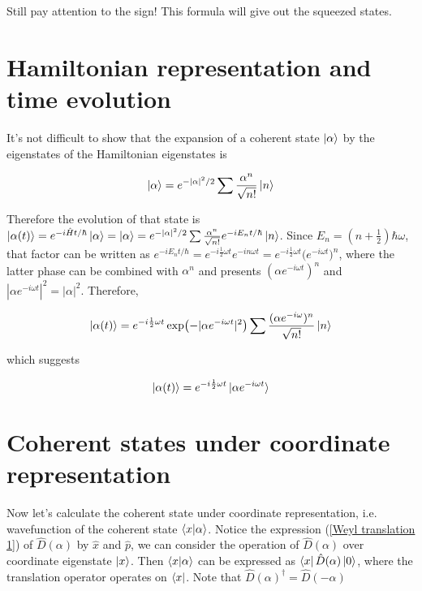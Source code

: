 \documentclass{article}
\begin{document}
        Still pay attention to the sign! This formula will give out the squeezed states. 

    


    \section{Hamiltonian representation and time evolution}
    
        It's not difficult to show that the expansion of a coherent state $\ket{\alpha}$ by the eigenstates of the Hamiltonian eigenstates is 

        \begin{equation}
            \ket{\alpha} = e^{-|\alpha|^2/2} \sum \frac{\alpha^n}{\sqrt{n!}}\ket{n}
        \end{equation}

        Therefore the evolution of that state is $\ket{\alpha(t)}=e^{-i\hat{H}t/\hbar}\ket{\alpha}=\ket{\alpha} = e^{-|\alpha|^2/2} \sum \frac{\alpha^n}{\sqrt{n!}}e^{-iE_nt/\hbar}\ket{n}$. Since $E_n=(n+\frac{1}{2})\hbar\omega$, that factor can be written as $e^{-iE_nt/\hbar}=e^{-i\frac{1}{2}\omega t}e^{-in\omega t}=e^{-i\frac{1}{2}\omega t}\bigl(e^{-i\omega t}\bigr)^n$, where the latter phase can be combined with $\alpha^n$ and presents $(\alpha e^{-i\omega t})^n$ and $|\alpha e^{-i\omega t}|^2=|\alpha|^2$. Therefore, 

        \begin{equation}
            \ket{\alpha(t)} = e^{-i\frac{1}{2}\omega t} \exp\bigl(-|\alpha e^{-i\omega t}|^2\bigr) \sum \frac{(\alpha e^{-i\omega})^n}{\sqrt{n!}}\ket{n}
        \end{equation}

        which suggests 

        \begin{equation}
            \ket{\alpha(t)} = e^{-i\frac{1}{2}\omega t} \ket{\alpha e^{-i\omega t}}
        \end{equation}

        

    \section{Coherent states under coordinate representation}
        
        Now let's calculate the coherent state under coordinate representation, i.e. wavefunction of the coherent state $\braket{x|\alpha}$. Notice the expression (\ref{Weyl translation 1}) of $\hat{D}(\alpha)$ by $\hat{x}$ and $\hat{p}$, we can consider the operation of $\hat{D}(\alpha)$ over coordinate eigenstate $\ket{x}$. Then  $\braket{x|\alpha}$ can be expressed as $\bra{x}\hat{D}(\alpha)\ket{{0}}$, where the translation operator operates on $\bra{x}$. Note that $\hat{D}(\alpha)^\dagger=\hat{D}(-\alpha)$
\end{document}
